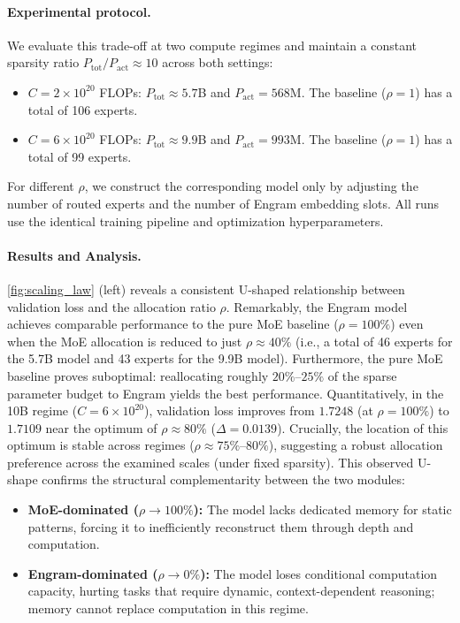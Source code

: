 \paragraph{Experimental protocol.}
We evaluate this trade-off at two compute regimes and maintain a constant sparsity ratio $P_{\mathrm{tot}} / P_{\mathrm{act}} \approx 10$ across both settings:
\begin{itemize}[leftmargin=*,itemsep=2pt,topsep=2pt]
    \item \textbf{$C=2\times 10^{20}$} FLOPs: $P_{\mathrm{tot}}\approx 5.7$B and $P_{\mathrm{act}}=568$M. The baseline ($\rho=1$) has a total of 106 experts.
    \item \textbf{$C=6\times 10^{20}$} FLOPs: $P_{\mathrm{tot}}\approx 9.9$B and $P_{\mathrm{act}}=993$M. The baseline ($\rho=1$) has a total of 99 experts.
\end{itemize}
For different $\rho$, we construct the corresponding model only by adjusting the number of routed experts and the number of Engram embedding slots.
All runs use the identical training pipeline and optimization hyperparameters.

\paragraph{Results and Analysis.}
\autoref{fig:scaling_law} (left) reveals a consistent U-shaped relationship between validation loss and the allocation ratio $\rho$.
Remarkably, the Engram model achieves comparable performance to the pure MoE baseline ($\rho=100\%$) even when the MoE allocation is reduced to just $\rho \approx 40\%$ (i.e., a total of 46 experts for the 5.7B model and 43 experts for the 9.9B model).
Furthermore, the pure MoE baseline proves suboptimal: reallocating roughly $20\%\text{--}25\%$ of the sparse parameter budget to Engram yields the best performance.
Quantitatively, in the 10B regime ($C=6\times 10^{20}$), validation loss improves from $1.7248$ (at $\rho=100\%$) to $1.7109$ near the optimum of $\rho\approx 80\%$ ($\Delta=0.0139$).
Crucially, the location of this optimum is stable across regimes ($\rho \approx 75\%\text{--}80\%$), suggesting a robust allocation preference across the examined scales (under fixed sparsity). This observed U-shape confirms the structural complementarity between the two modules:
\begin{itemize}[leftmargin=*,itemsep=2pt,topsep=2pt]
    \item \textbf{MoE-dominated ($\rho \to 100\%$):} The model lacks dedicated memory for static patterns, forcing it to inefficiently reconstruct them through depth and computation.
    \item \textbf{Engram-dominated ($\rho \to 0\%$):} The model loses conditional computation capacity, hurting tasks that require dynamic, context-dependent reasoning; memory cannot replace computation in this regime.
\end{itemize}


